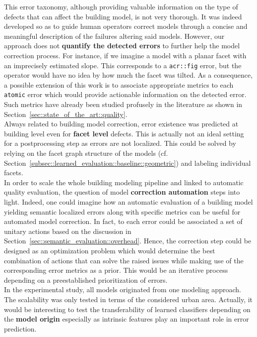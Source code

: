     This error taxonomy, although providing valuable information on the type of defects that can affect the building model, is not very thorough.
    It was indeed developed so as to guide human operators correct models through a concise and meaningful description of the failures altering said models.
    However, our approach does not \textbf{quantify the detected errors} to further help the model correction process.
    For instance, if we imagine a model with a planar facet with an imprecisely estimated slope.
    This corresponds to a \texttt{\acrfull{acr::fig}} error, but the operator would have no idea by how much the facet was tilted.
    As a consequence, a possible extension of this work is to associate appropriate metrics to each \texttt{atomic} error which would provide actionable information on the detected error.
    Such metrics have already been studied profusely in the literature as shown in Section~\ref{sec::state_of_the_art::quality}.\\

    Always related to building model correction, error existence was predicted at building level even for \textbf{facet level} defects.
    This is actually not an ideal setting for a postprocessing step as errors are not localized.
    This could be solved by relying on the facet graph structure of the models (cf. Section~\ref{subsec::learned_evaluation::baseline::geometric}) and labeling individual facets.\\

    In order to scale the whole building modeling pipeline and linked to automatic quality evaluation, the question of model \textbf{correction automation} steps into light.
    Indeed, one could imagine how an automatic evaluation of a building model yielding semantic localized errors along with specific metrics can be useful for automated model correction.
    In fact, to each error could be associated a set of unitary actions based on the discussion in Section~\ref{sec::semantic_evaluation::overhead}.
    Hence, the correction step could be designed as an optimization problem which would determine the best combination of actions that can solve the raised issues while making use of the corresponding error metrics as a prior.
    This would be an iterative process depending on a preestablished prioritization of errors.\\
    
    In the experimental study, all models originated from one modeling approach.
    The scalability was only tested in terms of the considered urban area.
    Actually, it would be interesting to test the transferability of learned classifiers depending on the \textbf{model origin} especially as intrinsic features play an important role in error prediction.\\

